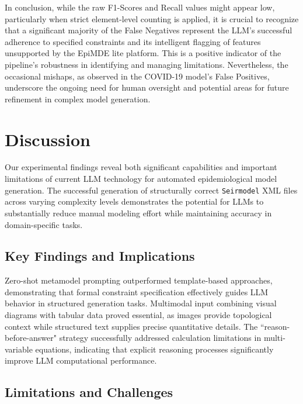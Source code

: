 \documentclass[conference]{IEEEtran}
\begin{document}
In conclusion, while the raw F1-Scores and Recall values might appear low, particularly when strict element-level counting is applied, it is crucial to recognize that a significant majority of the False Negatives represent the LLM's successful adherence to specified constraints and its intelligent flagging of features unsupported by the EpiMDE lite platform. This is a positive indicator of the pipeline's robustness in identifying and managing limitations. Nevertheless, the occasional mishaps, as observed in the COVID-19 model's False Positives, underscore the ongoing need for human oversight and potential areas for future refinement in complex model generation.

\section{Discussion}

Our experimental findings reveal both significant capabilities and important limitations of current LLM technology for automated epidemiological model generation. The successful generation of structurally correct \texttt{Seirmodel} XML files across varying complexity levels demonstrates the potential for LLMs to substantially reduce manual modeling effort while maintaining accuracy in domain-specific tasks.

\subsection{Key Findings and Implications}

Zero-shot metamodel prompting outperformed template-based approaches, demonstrating that formal constraint specification effectively guides LLM behavior in structured generation tasks. Multimodal input combining visual diagrams with tabular data proved essential, as images provide topological context while structured text supplies precise quantitative details. The ``reason-before-answer" strategy successfully addressed calculation limitations in multi-variable equations, indicating that explicit reasoning processes significantly improve LLM computational performance.

\subsection{Limitations and Challenges}
\end{document}
